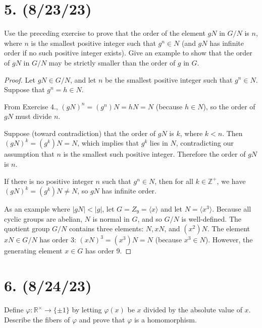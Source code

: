 \documentclass{article}
\begin{document}
\section*{5. (8/23/23)}

Use the preceding exercise to prove that the order of the element $gN$ in $G/N$ is $n$, where $n$ is the smallest positive integer such that $g^n \in N$ (and $gN$ has infinite order if no such positive integer exists). Give an example to show that the order of $gN$ in $G/N$ may be strictly smaller than the order of $g$ in $G$.

\begin{proof}
    Let $gN \in G/N$, and let $n$ be the smallest positive integer such that $g^n \in N$. Suppose that $g^n = h \in N$.

    From Exercise 4., $(gN)^n = (g^n)N = hN = N$ (because $h \in N$), so the order of $gN$ must divide $n$.

    Suppose (toward contradiction) that the order of $gN$ is $k$, where $k < n$. Then $(gN)^k = (g^k)N = N$, which implies that $g^k$ lies in $N$, contradicting our assumption that $n$ is the smallest such positive integer. Therefore the order of $gN$ is $n$.

    If there is no positive integer $n$ such that $g^n \in N$, then for all $k \in \mathbb{Z}^+$, we have $(gN)^k = (g^k)N \neq N$, so $gN$ has infinite order.

    As an example where $|gN| < |g|$, let $G = Z_9 = \langle x \rangle$ and let $N = \langle x^3 \rangle$. Because all cyclic groups are abelian, $N$ is normal in $G$, and so $G/N$ is well-defined. The quotient group $G/N$ contains three elements: $N, xN$, and $(x^2)N$. The element $xN \in G/N$ has order 3: $(xN)^3 = (x^3)N = N$ (because $x^3 \in N$). However, the generating element $x \in G$ has order 9.
\end{proof}

\section*{6. (8/24/23)}

Define $\varphi: \mathbb{R}^\times \rightarrow \{ \pm 1 \}$ by letting $\varphi(x)$ be $x$ divided by the absolute value of $x$. Describe the fibers of $\varphi$ and prove that $\varphi$ is a homomorphism.
\end{document}
